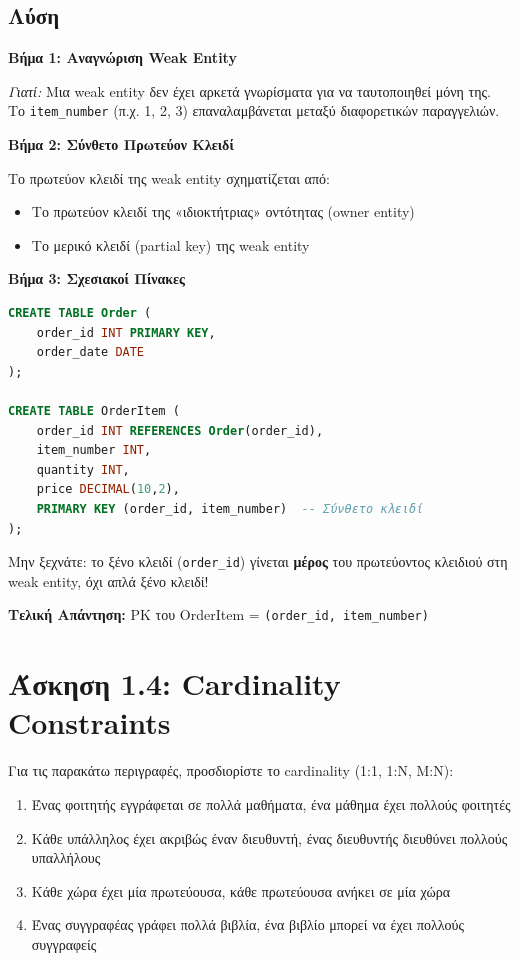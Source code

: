 \subsection*{Λύση}

\textbf{Βήμα 1: Αναγνώριση Weak Entity}

\textit{Γιατί:} Μια weak entity δεν έχει αρκετά γνωρίσματα για να ταυτοποιηθεί μόνη
της. Το \texttt{item\_number} (π.χ. 1, 2, 3) επαναλαμβάνεται μεταξύ διαφορετικών
παραγγελιών.

\textbf{Βήμα 2: Σύνθετο Πρωτεύον Κλειδί}

Το πρωτεύον κλειδί της weak entity σχηματίζεται από:
\begin{itemize}
    \item Το πρωτεύον κλειδί της «ιδιοκτήτριας» οντότητας (owner entity)
    \item Το μερικό κλειδί (partial key) της weak entity
\end{itemize}

\textbf{Βήμα 3: Σχεσιακοί Πίνακες}

\begin{lstlisting}[language=SQL]
CREATE TABLE Order (
    order_id INT PRIMARY KEY,
    order_date DATE
);

CREATE TABLE OrderItem (
    order_id INT REFERENCES Order(order_id),
    item_number INT,
    quantity INT,
    price DECIMAL(10,2),
    PRIMARY KEY (order_id, item_number)  -- Σύνθετο κλειδί
);
\end{lstlisting}

\begin{warningbox}
Μην ξεχνάτε: το ξένο κλειδί (\texttt{order\_id}) γίνεται \textbf{μέρος} του
πρωτεύοντος κλειδιού στη weak entity, όχι απλά ξένο κλειδί!
\end{warningbox}

\textbf{Τελική Απάντηση:} PK του OrderItem = \texttt{(order\_id, item\_number)}

\section{Άσκηση 1.4: Cardinality Constraints}

\begin{formulabox}[Εκφώνηση]
Για τις παρακάτω περιγραφές, προσδιορίστε το cardinality (1:1, 1:N, M:N):

\begin{enumerate}
    \item Ένας φοιτητής εγγράφεται σε πολλά μαθήματα, ένα μάθημα έχει πολλούς φοιτητές
    \item Κάθε υπάλληλος έχει ακριβώς έναν διευθυντή, ένας διευθυντής διευθύνει πολλούς υπαλλήλους
    \item Κάθε χώρα έχει μία πρωτεύουσα, κάθε πρωτεύουσα ανήκει σε μία χώρα
    \item Ένας συγγραφέας γράφει πολλά βιβλία, ένα βιβλίο μπορεί να έχει πολλούς συγγραφείς
\end{enumerate}
\end{formulabox}


